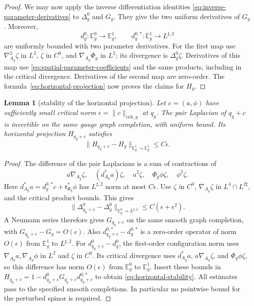 \documentclass[11pt]{amsart}
\newtheorem{lemma}[theorem]{Lemma}
\theoremstyle{definition}
\theoremstyle{remark}
\theoremstyle{plain}
\begin{document}
\begin{proof}
We may now apply the inverse differentiation identities
\eqref{eq:inverse-parameter-derivatives} to $\Delta_g^0$ and $G_g$.
They give the two uniform derivatives of $G_g$.
Moreover,
\[
 d_g^0:\mathbb E_g^0\longrightarrow\mathbb E_g^1,\qquad
 d_g^{0,*}:\mathbb E_g^1\longrightarrow L^{\sharp,2}
\]
are uniformly bounded with two parameter derivatives.
For the first map use $\nabla_{A_g}^2\zeta$ in $L^2$,
$\zeta$ in $C^0$, and $\nabla_{A_g}\Phi_g$ in $L^2$;
its divergence is $\Delta_g^0\zeta$.
Derivatives of this map use
\eqref{eq:spatial-parameter-coefficients} and the same products,
including in the critical divergence.
Derivatives of the second map are zero-order.
The formula~\eqref{eq:horizontal-projection} now proves the claims for
$H_g$.
\end{proof}

\begin{lemma}[stability of the horizontal projection]
\label{lem:horizontal-stability}
Let $c=(a,\phi)$ have sufficiently small critical norm
$\epsilon=\|c\|_{\mathrm{crit},g}$ at $q_g$.  The pair Laplacian of
$q_g+c$ is invertible on the same gauge graph completion, with uniform
bound.  Its horizontal projection $H_{q_g+c}$ satisfies
\begin{equation}\label{eq:horizontal-stability}
 \|H_{q_g+c}-H_g\|_{\mathbb E_g^1\to\mathbb E_g^1}\leq C\epsilon.
\end{equation}
\end{lemma}
\begin{proof}
The difference of the pair Laplacians is a sum of contractions of
\[
 a\nabla_{A_g}\zeta,\quad (d_{A_g}^*a)\zeta,\quad
 a^2\zeta,\quad \Phi_g\phi\zeta,\quad\phi^2\zeta.
\]
Here $d_{A_g}^*a=d_g^{0,*}c+\mathfrak r_{\Phi_g}^*\phi$ has
$L^{\sharp,2}$ norm at most $C\epsilon$.
Use $\zeta$ in $C^0$, $\nabla_{A_g}\zeta$ in
$L^4\cap L^{2\sharp}$, and the critical product bounds.  This gives
\[
 \|\Delta_{q_g+c}^0-\Delta_g^0\|_{
       \mathbb E_g^0\to L^{\sharp,2}}
 \leq C(\epsilon+\epsilon^2).
\]
A Neumann series therefore gives $G_{q_g+c}$ on the same smooth
graph completion, with $G_{q_g+c}-G_g=O(\epsilon)$.
Also $d_{q_g+c}^{0,*}-d_g^{0,*}$ is a zero-order operator of norm
$O(\epsilon)$ from $\mathbb E_g^1$ to $L^{\sharp,2}$.
For $d_{q_g+c}^0-d_g^0$, the first-order configuration norm uses
$\nabla_{A_g}a,\nabla_{A_g}\phi$ in $L^2$ and $\zeta$ in $C^0$.
Its critical divergence uses $d_{A_g}^*a$, $a\nabla_{A_g}\zeta$, and
$\Phi_g\phi\zeta$, so this difference has norm $O(\epsilon)$ from
$\mathbb E_g^0$ to $\mathbb E_g^1$.
Insert these bounds in
$H_{q_g+c}=1-d_{q_g+c}^0G_{q_g+c}d_{q_g+c}^{0,*}$ to obtain
\eqref{eq:horizontal-stability}.  All estimates pass to the specified
smooth completions.  In particular no pointwise bound for the perturbed
spinor is required.
\end{proof}
\end{document}
